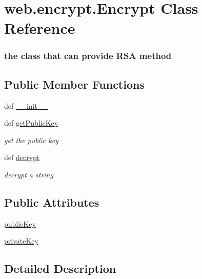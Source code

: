 \hypertarget{classweb_1_1encrypt_1_1_encrypt}{\section{web.\-encrypt.\-Encrypt Class Reference}
\label{classweb_1_1encrypt_1_1_encrypt}
}


\subsubsection*{the class that can provide R\-S\-A method } 


\subsection*{Public Member Functions}
\begin{DoxyCompactItemize}
\item 
def \hyperlink{classweb_1_1encrypt_1_1_encrypt_a7ac013ef450d16011e76b7af95c25f3d}{\-\_\-\-\_\-init\-\_\-\-\_\-}
\item 
def \hyperlink{classweb_1_1encrypt_1_1_encrypt_ad9c50ce7eec9117081e4d86a9bfd87c9}{get\-Public\-Key}
\begin{DoxyCompactList}\small\item\em get the public key \end{DoxyCompactList}\item 
def \hyperlink{classweb_1_1encrypt_1_1_encrypt_afcab4d2eea9fe8213086a46253e72316}{decrypt}
\begin{DoxyCompactList}\small\item\em decrypt a string \end{DoxyCompactList}\end{DoxyCompactItemize}
\subsection*{Public Attributes}
\begin{DoxyCompactItemize}
\item 
\hyperlink{classweb_1_1encrypt_1_1_encrypt_a1e54531b2aac210260199608edc7f62c}{public\-Key}
\item 
\hyperlink{classweb_1_1encrypt_1_1_encrypt_a1145a5b40bf2a2ff38383b34d4d86dc8}{private\-Key}
\end{DoxyCompactItemize}


\subsection{Detailed Description}
